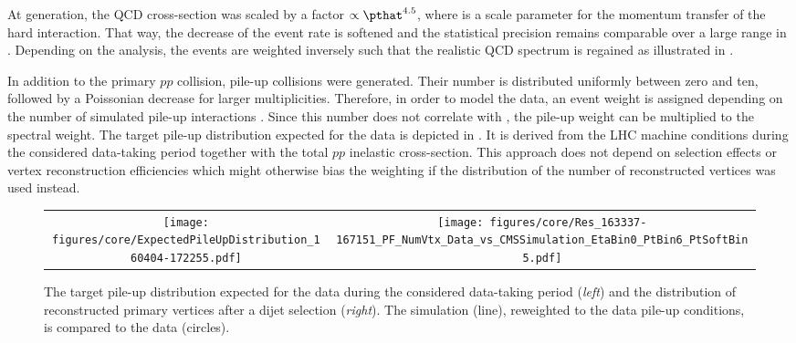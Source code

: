 At generation, the QCD cross-section was scaled by a factor $\propto\pthat^{4.5}$, where \pthat is a scale parameter for the momentum transfer of the hard interaction.
That way, the decrease of the event rate is softened and the statistical precision remains comparable over a large range in \pthat.
Depending on the analysis, the events are weighted inversely such that the realistic QCD spectrum is regained as illustrated in .
\begin{figure}[!htb]
  \centering
  \caption{}
  \label{fig:Jets:EvtSimulation:FlatQCDSpectrum}
\end{figure}

In addition to the primary $pp$ collision, pile-up collisions were generated.
Their number is distributed uniformly between zero and ten, followed by a Poissonian decrease for larger multiplicities.
Therefore, in order to model the data, an event weight is assigned depending on the number of simulated pile-up interactions \addref.
Since this number does not correlate with \pthat, the pile-up weight can be multiplied to the spectral weight.
The target pile-up distribution expected for the data is depicted in .
It is derived from the LHC machine conditions during the considered data-taking period together with the total $pp$ inelastic cross-section.
This approach does not depend on selection effects or vertex reconstruction efficiencies which might otherwise bias the weighting if the distribution of the number of reconstructed vertices was used instead.
\begin{figure}[!htb]
  \centering
  \begin{tabular}{cc}
    \texttt{[image: figures/core/ExpectedPileUpDistribution\_160404-172255.pdf]} &
    \texttt{[image: figures/core/Res\_163337-167151\_PF\_NumVtx\_Data\_vs\_CMSSimulation\_EtaBin0\_PtBin6\_PtSoftBin5.pdf]} \\
  \end{tabular}
  \caption{The target pile-up distribution expected for the data during the considered data-taking period (\textit{left}) and the distribution of reconstructed primary vertices after a dijet selection (\textit{right}).
    The simulation (line), reweighted to the data pile-up conditions, is compared to the data (circles).}
  \label{fig:Jets:EvtSimulation:PUReweighting}
\end{figure}

